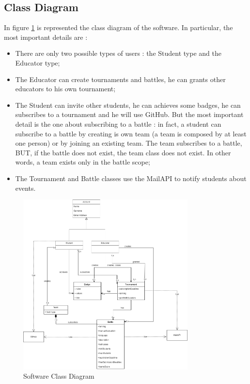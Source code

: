 \subsection{Class Diagram}
{\color{red}{AGGIUNGERE classe testcase. TOGLIERE TeamScore, è uguale a ranking in battle. Togliere creates battle da educator, ridondante}}
In figure \ref{fig:software-class-diagram} is represented the class diagram of the software. In particular, the most important details are :
\begin{itemize}
    \item There are only two possible types of users : the Student type and the Educator type;
    \item The Educator can create tournaments and battles, he can grants other educators to his own tournament;
    \item The Student can invite other students, he can achieves some badges, he can subscribes to a tournament and he will use GitHub. But the most important detail is the one about subscribing to a battle : in fact, a student can subscribe to a battle by creating is own team (a team is composed by at least one person) or by joining an existing team. The team subscribes to a battle, BUT, if the battle does not exist, the team class does not exist. In other words, a team exists only in the battle scope;
    \item The Tournament and Battle classes use the MailAPI to notify students about events.

\end{itemize}
\begin{figure}[H]
    \centering
    \includegraphics[width=0.8\textwidth]{images/state_diagrams/ClassDiagram.png}
    \caption{Software Class Diagram}
    \label{fig:software-class-diagram}
\end{figure}

